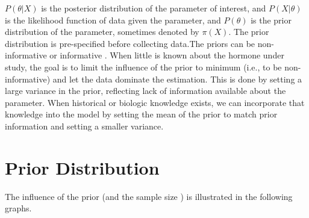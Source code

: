 \documentclass[11pt]{book}
\begin{document}
$P(\theta|X)$ is the posterior distribution of the parameter of interest, and  $P(X|\theta)$ is the likelihood function of data given the parameter, and  $P(\theta)$ is the prior distribution of the parameter, sometimes denoted by $\pi(X)$. The prior distribution is pre-specified before collecting data.The priors can be non-informative or informative .  When little is known about the hormone under study, the goal is to limit the influence of the prior to minimum (i.e., to be non-informative) and let the data dominate the estimation.  This is done by setting a large variance in the prior, reflecting lack of information available about the parameter.  When historical or biologic knowledge exists, we can incorporate that knowledge into the model by setting the mean of the prior to match prior information and setting a smaller variance.

\section{Prior Distribution}
The influence of the prior (and the sample size ) is illustrated in the following graphs.
\end{document}
